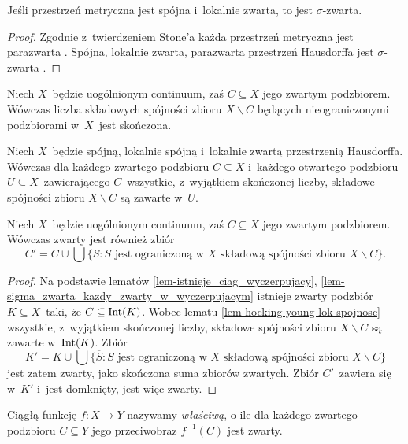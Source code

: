 \begin{lem}\label{lem-spojna_lok_zwarta_jest_sigma_zwarta}
Jeśli przestrzeń metryczna jest spójna i~lokalnie zwarta, to jest $\sigma$-zwarta.
\end{lem}
\begin{proof}
Zgodnie z~twierdzeniem Stone'a każda przestrzeń metryczna jest parazwarta \cite[Twierdzenie 5.1.3]{Engelking75}. Spójna, lokalnie zwarta, parazwarta przestrzeń Hausdorffa jest $\sigma$-zwarta \cite[Appendix A to Chapter 1]{Spivak99}. 
\end{proof}

\begin{lem}\label{lem-malo_nieogr_skl}
Niech $X$~będzie uogólnionym continuum, zaś $C\subseteq X$ jego zwartym podzbiorem. Wówczas liczba składowych spójności zbioru $X\smallsetminus C$ będących nieograniczonymi podzbiorami w~$X$~jest skończona.
\end{lem}

\begin{lem}\label{lem-hocking-young-lok-spojnosc}
Niech $X$~będzie spójną, lokalnie spójną i~lokalnie zwartą przestrzenią Hausdorffa. Wówczas dla każdego zwartego podzbioru $C\subseteq X$ i~każdego otwartego podzbioru $U\subseteq X$~zawierającego $C$~wszystkie, z~wyjątkiem skończonej liczby, składowe spójności zbioru $X\smallsetminus C$ są zawarte w~$U$.
\end{lem}

\begin{lem}\label{lem-dorzucanie_skladowych_a_zwartosc}
Niech $X$~będzie uogólnionym continuum, zaś $C\subseteq X$ jego zwartym podzbiorem. Wówczas zwarty jest również zbiór \[C'=C\cup\bigcup\{S:S\text{ jest ograniczoną w } X \text{ składową spójności zbioru } X\smallsetminus C\}.\]
\end{lem}
\begin{proof}
Na podstawie lematów \ref{lem-istnieje_ciag_wyczerpujacy}, \ref{lem-sigma_zwarta_kazdy_zwarty_w_wyczerpujacym} istnieje zwarty podzbiór $K\subseteq X$~taki, że $C\subseteq \operatorname{Int}(K)$. Wobec lematu \ref{lem-hocking-young-lok-spojnosc} wszystkie, z~wyjątkiem skończonej liczby, składowe spójności zbioru $X\smallsetminus C$ są zawarte w~$\operatorname{Int}(K)$. Zbiór \[K'=K\cup \bigcup\{\overline{S}:S\text{ jest ograniczoną w } X \text{ składową spójności zbioru } X\smallsetminus C\}\] jest zatem zwarty, jako skończona suma zbiorów zwartych. Zbiór $C'$~zawiera się w~$K'$ i~jest domknięty, jest więc zwarty.
\end{proof}
Ciągłą funkcję $f\colon X\to Y$ nazywamy \textit{właściwą}, o ile dla każdego zwartego podzbioru $C\subseteq Y$ jego przeciwobraz $f^{-1}(C)$ jest zwarty.


